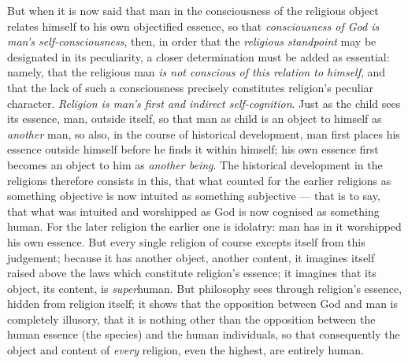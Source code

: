 \documentclass[12pt,a4paper]{book}
\begin{document}
But when it is now said that man in the consciousness of the religious object
relates himself to his own objectified essence, so that \emph{consciousness of
God is man's self-consciousness}, then, in order that the \emph{religious
standpoint} may be designated in its peculiarity, a closer determination must
be added as essential: namely, that the religious man \emph{is not conscious of
this relation to himself}, and that the lack of such a consciousness precisely
constitutes religion's peculiar character. \emph{Religion is man's first and
indirect self-cognition}. Just as the child sees its essence, man, outside
itself, so that man as child is an object to himself as \emph{another} man, so
also, in the course of historical development, man first places his essence
outside himself before he finds it within himself; his own essence first
becomes an object to him as \emph{another being}. The historical development
in the religions therefore consists in this, that what counted for the earlier
religions as something objective is now intuited as something subjective ---
that is to say, that what was intuited and worshipped as God is now cognised
as something human. For the
later religion the earlier one is idolatry: man has in it worshipped his own
essence. But every single religion of course excepts itself from this
judgement; because it has another object, another content, it imagines itself
raised above the laws which constitute religion's essence; it imagines that
its object, its content, is \emph{super}human. But philosophy sees through
religion's essence, hidden from religion itself; it shows that the opposition
between God and man is completely illusory, that it is nothing other than the
opposition between the human essence (the species) and the human individuals,
so that consequently the object and content of \emph{every} religion, even the
highest, are entirely human.
\end{document}
